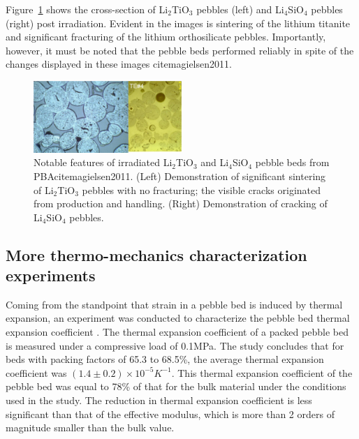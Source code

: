 Figure~\ref{fig:pba} shows the cross-section of Li$_2$TiO$_3$ pebbles (left) and Li$_4$SiO$_4$ pebbles (right) post irradiation. Evident in the images is sintering of the lithium titanite and significant fracturing of the lithium orthosilicate pebbles. Importantly, however, it must be noted that the pebble beds performed reliably in spite of the changes displayed in these images cite{magielsen2011}. 


\begin{figure}[t!]
\centering
\includegraphics[width=0.5\textwidth]{chapters/figures/Fig-10}
\caption{Notable features of irradiated Li$_2$TiO$_3$ and Li$_4$SiO$_4$ pebble beds from PBAcite{magielsen2011}. (Left) Demonstration of significant sintering of Li$_2$TiO$_3$ pebbles with no fracturing; the visible cracks originated from production and handling. (Right) Demonstration of cracking of Li$_4$SiO$_4$ pebbles.}
\label{fig:pba}
\end{figure}


\subsection{More thermo-mechanics characterization experiments}
Coming from the standpoint that strain in a pebble bed is induced by thermal expansion, an experiment was conducted to characterize the pebble bed thermal expansion coefficient \cite{Tanigawa:2007fc}.  The thermal expansion coefficient of a packed \lit pebble bed is measured under a compressive load of 0.1MPa.  The study concludes that for beds with packing factors of 65.3 to 68.5\%, the average thermal expansion coefficient was $(1.4\pm0.2)\times10^{-5}K^{-1}$. This thermal expansion coefficient of the pebble bed was equal to 78\% of that for the bulk material under the conditions used in the study. The reduction in thermal expansion coefficient is less significant than that of the effective modulus, which is more than 2 orders of magnitude smaller than the bulk value. 

